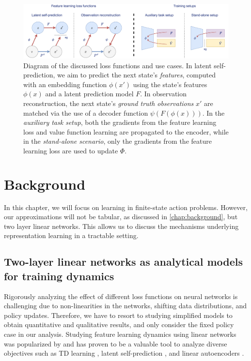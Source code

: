 \begin{figure}
    \centering
    \includegraphics[width=\textwidth]{illustrations/understanding/all_in_one_repeat.pdf}
    \caption{Diagram of the discussed loss functions and use cases. In latent self-prediction, we aim to predict the next state's \emph{features}, computed with an embedding function $\phi(x')$ using the state's features $\phi(x)$ and a latent prediction model $F$. In observation reconstruction, the next state's \emph{ground truth observations} $x'$ are matched via the use of a decoder function $\psi(F(\phi(x)))$. In the \emph{auxiliary task setup}, both the gradients from the feature learning loss and value function learning are propagated to the encoder, while in the \emph{stand-alone scenario}, only the gradients from the feature learning loss are used to update $\Phi$.}
    \label{fig:understanding:losses}
\end{figure}

\section{Background}
In this chapter, we will focus on learning in finite-state action problems.
However, our approximations will not be tabular, as discussed in \autoref{chap:background}, but two layer linear networks.
This allows us to discuss the mechanisms underlying representation learning in a tractable setting.

\subsection{Two-layer linear networks as analytical models for training dynamics}
\label{sec:understanding:background}

Rigorously analyzing the effect of different loss functions on neural networks is challenging due to non-linearities in the networks, shifting data distributions, and policy updates.
Therefore, we have to resort to studying simplified models to obtain quantitative and qualitative results, and only consider the fixed policy case in our analysis.
Studying feature learning dynamics using linear networks was popularized by \textcite{saxe2014exact} and has proven to be a valuable tool to analyze diverse objectives such as TD learning \parencite{tang2023towards,lelan2023bootstrapped}, latent self-prediction \parencite{tian2021understanding,tang2022understanding}, and linear autoencoders \parencite{pretorius2018learning,bao2020regularized}.

